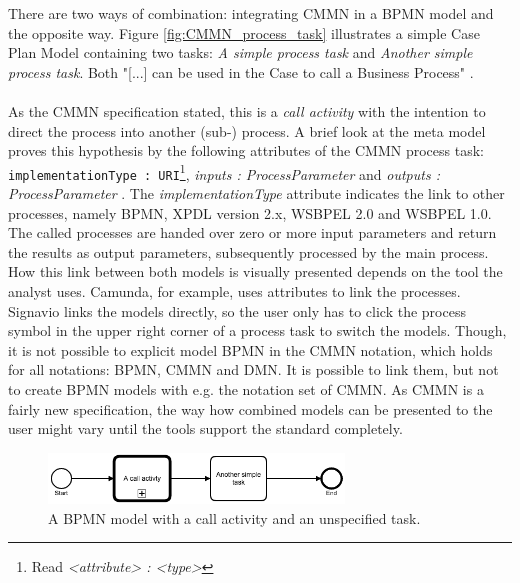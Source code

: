 There are two ways of combination: integrating CMMN in a BPMN model and the opposite way. 
Figure \ref{fig:CMMN_process_task} illustrates a simple Case Plan Model containing two tasks: \textit{A simple process task} and \textit{Another simple process task}. Both "[...] can be used in the Case to call a Business Process" \cite{CMMNspec2014}.\\\\
As the CMMN specification stated, this is a \textit{call activity} with the intention to direct the process into another (sub-) process. A brief look at the meta model proves this hypothesis by the following attributes of the CMMN process task: \texttt{implementationType : URI}\footnote{Read \textit{<attribute> : <type>}}, \textit{inputs : ProcessParameter} and \textit{outputs : ProcessParameter} \cite{CMMNspec2014}. The \textit{implementationType} attribute indicates the link to other processes, namely \ac{BPMN}, \ac{XPDL} version 2.x, \ac{WSBPEL} 2.0 and  \ac{WSBPEL} 1.0. The called processes are handed over zero or more input parameters and return the results as output parameters, subsequently processed by the main process. \\
How this link between both models is visually presented depends on the tool the analyst uses. Camunda, for example, uses attributes to link the processes. Signavio links the models directly, so the user only has to click the process symbol in the upper right corner of a process task to switch the models. Though, it is not possible to explicit model BPMN in the CMMN notation, which holds for all notations: BPMN, CMMN and DMN. It is possible to link them, but not to create BPMN models with e.g. the notation set of CMMN. As CMMN is a fairly new specification, the way how combined models can be presented to the user might vary until the tools support the standard completely. \newpage

\begin{figure}
  \centering
    \includegraphics[width=0.7\textwidth]{../figures/chapter_combinations/BPMN_Call_Task.png}
      \caption{A BPMN model with a call activity and an unspecified task.}
      \label{fig:BPMN_call_activity}
\end{figure}

